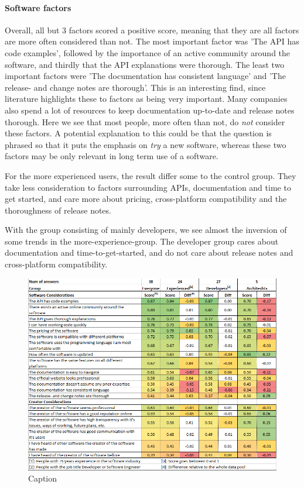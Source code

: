 \documentclass{article}
\begin{document}
\paragraph{Software factors}

Overall, all but 3 factors scored a positive score, meaning that they
are all factors are more often considered than not. The most important
factor was 'The API has code examples', followed by the importance of an
active community around the software, and thirdly that the API
explanations were thorough. The least two important factors were 'The
documentation has consistent language' and 'The release- and change
notes are thorough'. This is an interesting find, since literature
highlights these to factors as being very important. Many companies also
spend a lot of resources to keep documentation up-to-date and release
notes thorough. Here we see that most people, more often than not, do
\textit{not} consider these factors. A potential explanation to this could be
that the question is phrased so that it puts the emphasis on \textit{try} a new
software, whereas these two factors may be only relevant in long term
use of a software.

For the more experienced users, the result differ some to the control
group. They take less consideration to factors surrounding APIs,
documentation and time to get started, and care more about pricing,
cross-platform compatibility and the thoroughness of release notes.

With the group consisting of mainly developers, we see almost the
inversion of some trends in the more-experience-group. The developer
group cares about documentation and time-to-get-started, and do not care
about release notes and cross-platform compatibility.

\begin{figure}
\centering
\includegraphics[width=\linewidth]{ScoresByPoints.png}
\caption{Caption}
\label{fig:scopresByPoints}
\end{figure}
\end{document}
